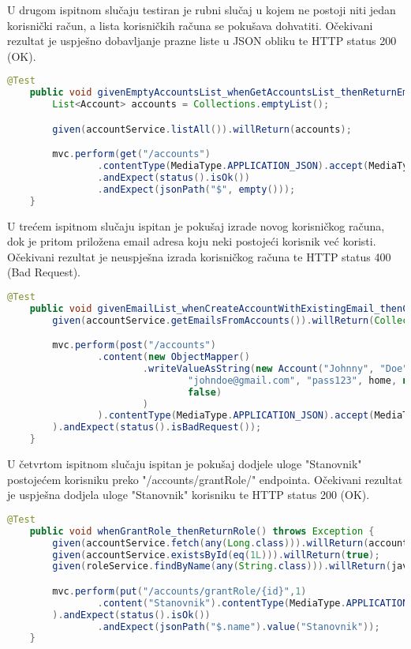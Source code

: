 			U drugom ispitnom slučaju testiran je rubni slučaj u kojem ne postoji niti jedan korisnički račun, a lista
			korisničkih računa se pokušava dohvatiti. Očekivani rezultat je uspješno dobavljanje prazne liste u JSON obliku te HTTP status 200 (OK).

			\begin{lstlisting}[language=Java, breaklines=true]
	@Test
    public void givenEmptyAccountsList_whenGetAccountsList_thenReturnEmptyJsonArray() throws Exception {
        List<Account> accounts = Collections.emptyList();

        given(accountService.listAll()).willReturn(accounts);

        mvc.perform(get("/accounts")
                .contentType(MediaType.APPLICATION_JSON).accept(MediaType.APPLICATION_JSON))
                .andExpect(status().isOk())
                .andExpect(jsonPath("$", empty()));
    }
			\end{lstlisting}

			U trećem ispitnom slučaju ispitan je pokušaj izrade novog korisničkog računa, dok je pritom priložena email adresa koju neki postojeći korisnik već koristi. Očekivani rezultat je neuspješna izrada korisničkog računa te HTTP status 400 (Bad Request).

			\begin{lstlisting}[language=Java, breaklines=true]
    @Test
    public void givenEmailList_whenCreateAccountWithExistingEmail_thenCauseError400() throws Exception {
        given(accountService.getEmailsFromAccounts()).willReturn(Collections.singletonList("johndoe@gmail.com"));

        mvc.perform(post("/accounts")
                .content(new ObjectMapper()
                        .writeValueAsString(new Account("Johnny", "Doe",
                                "johndoe@gmail.com", "pass123", home, null,
                                false)
                        )
                ).contentType(MediaType.APPLICATION_JSON).accept(MediaType.APPLICATION_JSON)
        ).andExpect(status().isBadRequest());
    }
			\end{lstlisting}

			U četvrtom ispitnom slučaju ispitan je pokušaj dodjele uloge "Stanovnik" postojećem korisniku preko "/accounts/grantRole/" endpointa.
			Očekivani rezultat je uspješna dodjela uloge "Stanovnik" korisniku te HTTP status 200 (OK).

			\begin{lstlisting}[language=Java, breaklines=true]
    @Test
    public void whenGrantRole_thenReturnRole() throws Exception {
        given(accountService.fetch(any(Long.class))).willReturn(account);
        given(accountService.existsById(eq(1L))).willReturn(true);
        given(roleService.findByName(any(String.class))).willReturn(java.util.Optional.of(new Role("Stanovnik")));

        mvc.perform(put("/accounts/grantRole/{id}",1)
                .content("Stanovnik").contentType(MediaType.APPLICATION_JSON).accept(MediaType.APPLICATION_JSON)
        ).andExpect(status().isOk())
                .andExpect(jsonPath("$.name").value("Stanovnik"));
    }
			\end{lstlisting}

